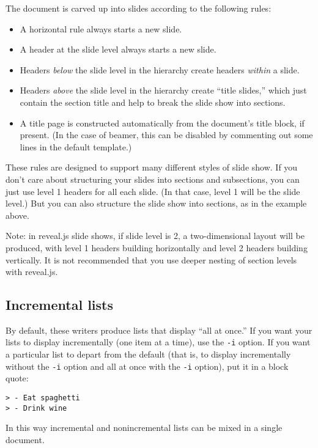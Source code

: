 \documentclass[]{article}
\begin{document}
The document is carved up into slides according to the following rules:

\begin{itemize}
\item
  A horizontal rule always starts a new slide.
\item
  A header at the slide level always starts a new slide.
\item
  Headers \emph{below} the slide level in the hierarchy create headers
  \emph{within} a slide.
\item
  Headers \emph{above} the slide level in the hierarchy create ``title
  slides,'' which just contain the section title and help to break the
  slide show into sections.
\item
  A title page is constructed automatically from the document's title
  block, if present. (In the case of beamer, this can be disabled by
  commenting out some lines in the default template.)
\end{itemize}

These rules are designed to support many different styles of slide show.
If you don't care about structuring your slides into sections and
subsections, you can just use level 1 headers for all each slide. (In
that case, level 1 will be the slide level.) But you can also structure
the slide show into sections, as in the example above.

Note: in reveal.js slide shows, if slide level is 2, a two-dimensional
layout will be produced, with level 1 headers building horizontally and
level 2 headers building vertically. It is not recommended that you use
deeper nesting of section levels with reveal.js.

\subsection{Incremental lists}\label{incremental-lists}

By default, these writers produce lists that display ``all at once.'' If
you want your lists to display incrementally (one item at a time), use
the \texttt{-i} option. If you want a particular list to depart from the
default (that is, to display incrementally without the \texttt{-i}
option and all at once with the \texttt{-i} option), put it in a block
quote:

\begin{verbatim}
> - Eat spaghetti
> - Drink wine
\end{verbatim}

In this way incremental and nonincremental lists can be mixed in a
single document.
\end{document}
